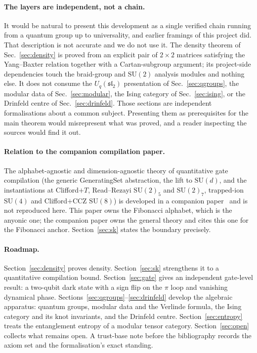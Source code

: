 \documentclass[aps,prx,nofootinbib,superscriptaddress,12pt]{revtex4-2}
\begin{document}
\paragraph{The layers are independent, not a chain.}
It would be natural to present this development as a single verified
chain running from a quantum group up to universality, and earlier
framings of this project did. That description is not accurate and we do
not use it. The density theorem of Sec.~\ref{sec:density} is proved from
an explicit pair of $2\times 2$ matrices satisfying the Yang--Baxter
relation together with a Cartan-subgroup argument; its project-side
dependencies touch the braid-group and $\mathrm{SU}(2)$ analysis modules
and nothing else. It does not consume the $U_q(\mathfrak{sl}_2)$
presentation of Sec.~\ref{sec:qgroups}, the modular data of
Sec.~\ref{sec:modular}, the Ising category of Sec.~\ref{sec:ising}, or
the Drinfeld centre of Sec.~\ref{sec:drinfeld}. Those sections are
independent formalisations about a common subject. Presenting them as
prerequisites for the main theorem would misrepresent what was proved,
and a reader inspecting the sources would find it out.

\paragraph{Relation to the companion compilation paper.}
The alphabet-agnostic and dimension-agnostic theory of quantitative
gate compilation (the generic \textsf{GeneratingSet} abstraction, the
lift to $\mathrm{SU}(d)$, and the instantiations at Clifford$+T$,
Read--Rezayi $\mathrm{SU}(2)_5$ and $\mathrm{SU}(2)_7$, trapped-ion
$\mathrm{SU}(4)$ and Clifford$+\mathrm{CCZ}$ $\mathrm{SU}(8)$) is
developed in a companion paper~\cite{RoehmD8Compilation} and is not
reproduced here. This paper owns the Fibonacci alphabet, which is the
anyonic one; the companion paper owns the general theory and cites this
one for the Fibonacci anchor. Section~\ref{sec:sk} states the boundary
precisely.

\paragraph{Roadmap.}
Section~\ref{sec:density} proves density.
Section~\ref{sec:sk} strengthens it to a quantitative compilation bound.
Section~\ref{sec:gate} gives an independent gate-level result: a
two-qubit dark state with a sign flip on the $\pi$ loop and vanishing
dynamical phase.
Sections~\ref{sec:qgroups}--\ref{sec:drinfeld} develop the algebraic
apparatus: quantum groups, modular data and the Verlinde formula, the
Ising category and its knot invariants, and the Drinfeld centre.
Section~\ref{sec:entropy} treats the entanglement entropy of a modular
tensor category.
Section~\ref{sec:open} collects what remains open. A trust-base note
before the bibliography records the axiom set and the formalisation's
exact standing.
\end{document}
